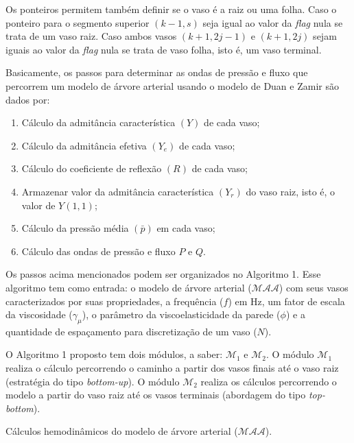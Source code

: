 \documentclass[
        english,			
        brazil			        %
        ,<...>]{abntbibufjf}
\begin{document}
Os ponteiros permitem também definir se o vaso é a raiz ou uma folha. Caso o ponteiro para o segmento superior $(k-1,s)$ seja igual ao valor da \textit{flag} nula se trata de um vaso raiz. Caso ambos vasos  $(k+1,2j-1)$ e $(k+1,2j)$ sejam iguais ao valor da \textit{flag} nula se trata de vaso folha, isto é, um vaso terminal.

Basicamente, os passos para determinar as ondas de pressão e fluxo que percorrem um modelo de árvore arterial usando o modelo de Duan e Zamir são dados por:
\begin{enumerate}
    \item Cálculo da admitância característica $(Y)$ de cada vaso;
    \item Cálculo da admitância efetiva $(Y_e)$  de cada vaso;
    \item Cálculo do coeficiente de reflexão $(R)$  de cada vaso; 
    \item Armazenar valor da admitância característica $(Y_r)$ do vaso raiz, isto é, o valor de $Y(1,1)$;
    \item Cálculo da pressão média $(\bar{p})$ em cada vaso;
    \item Cálculo das ondas de pressão e fluxo $P$ e $Q$.
\end{enumerate}

Os passos acima mencionados podem ser organizados no Algoritmo 1. Esse algoritmo tem como entrada: o modelo de árvore arterial ($\mathcal{MAA}$) com seus vasos caracterizados por suas propriedades, a frequência ($f$) em Hz, um fator de escala da viscosidade ($\gamma_{\mu}$), o parâmetro da viscoelasticidade da parede ($\phi$) e a quantidade de espaçamento para discretização de um vaso ($N$).

O Algoritmo 1 proposto tem dois módulos, a saber: $\mathcal{M}_1$ e $\mathcal{M}_2$. O módulo $\mathcal{M}_1$ realiza o cálculo percorrendo o caminho a partir dos vasos finais até o vaso raiz (estratégia do tipo \textit{bottom-up}). O módulo $\mathcal{M}_2$ realiza os cálculos percorrendo o modelo a partir do vaso raiz até os vasos terminais (abordagem do tipo \textit{top-bottom}).

\begin{algorithm}[H]
	\SetAlgoLined
\caption{Cálculos hemodinâmicos do modelo de árvore arterial ($\mathcal{MAA}$).}
\end{algorithm}
\end{document}
